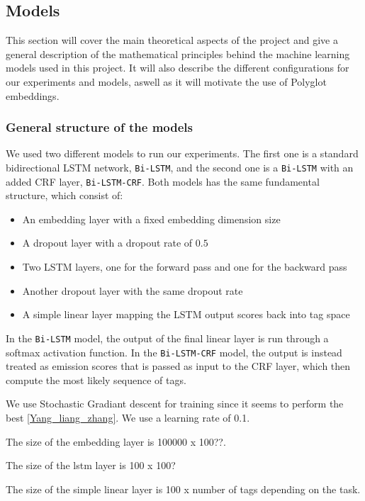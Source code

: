 
\subsection{Models}

This section will cover the main theoretical aspects of the project and give a
general description of the mathematical principles behind the machine learning
models used in this project. It will also describe the different configurations
for our experiments and models, aswell as it will motivate the use of Polyglot
embeddings.


\subsubsection{General structure of the models}

We used two different models to run our experiments. The first one is a standard
bidirectional LSTM network, \texttt{Bi-LSTM}, and the second one is a
\texttt{Bi-LSTM} with an added CRF layer, \texttt{Bi-LSTM-CRF}. Both models has
the same fundamental structure, which consist of:

\begin{itemize}
    \item An embedding layer with a fixed embedding dimension size
    \item A dropout layer with a dropout rate of $0.5$
    \item Two LSTM layers, one for the forward pass and one for the backward
        pass
    \item Another dropout layer with the same dropout rate
    \item A simple linear layer mapping the LSTM output scores back into tag
        space
\end{itemize}

In the \texttt{Bi-LSTM} model, the output of the final linear layer is run
through a softmax activation function. In the \texttt{Bi-LSTM-CRF} model, the
output is instead treated as emission scores that is passed as input to the CRF
layer, which then compute the most likely sequence of tags.

We use Stochastic Gradiant descent for training since it seems to perform the
best \ref{Yang_liang_zhang}. We use a learning rate of 0.1.

The size of the embedding layer is 100000 x 100??. 

The size of the lstm layer is 100 x 100?

The size of the simple linear layer is 100 x number of tags depending on the task.

